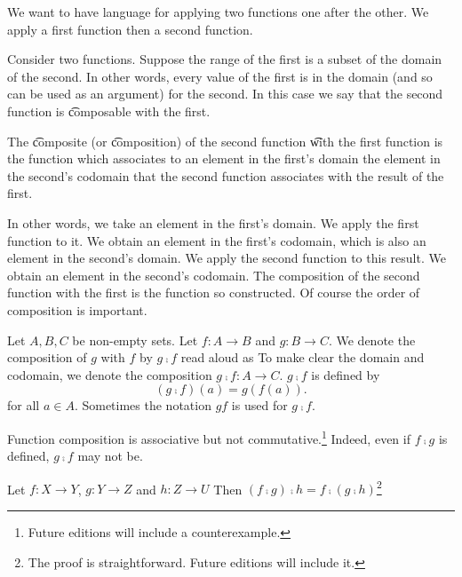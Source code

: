 

We want to have language for applying two functions one after the other.
We apply a first function then a second function.


Consider two functions.
Suppose the range of the first is a subset of the domain of the second.
In other words, every value of the first is in the domain (and so can be used as an argument) for the second.
In this case we say that the second function is \t{composable} with the first.

The \t{composite} (or \t{composition}) of the second function \t{with} the first function is the function which associates to an element in the first's domain the element in the second's codomain that the second function associates with the result of the first.

In other words, we take an element in the first's domain.
We apply the first function to it.
We obtain an element in the first's codomain, which is also an element in the second's domain.
We apply the second function to this result.
We obtain an element in the second's codomain.
The composition of the second function with the first is the function so constructed.
Of course the order of composition is important.


Let $A, B, C$ be non-empty sets.
Let $f: A \to B$ and $g: B \to C$.
We denote the composition of $g$ with $f$ by $g \comp f$ read aloud as 
To make clear the domain and codomain, we denote the composition $g \comp f: A \to C$.
$g \comp f$ is defined by
\[
  (g \comp f)(a) = g(f(a)).
\]
for all $a \in A$.
Sometimes the notation $gf$ is used for $g \comp f$.



Function composition is associative but not commutative.\footnote{Future editions will include a counterexample.}
Indeed, even if $f \comp g$ is defined, $g \comp f$ may not be.

\begin{proposition}[Associative]
Let $f: X \to Y$, $g: Y \to Z$ and $h: Z \to U$
Then $(f \comp g) \comp h = f \comp (g \comp h)$\footnote{The proof is straightforward. Future editions will include it.}
\end{proposition}
